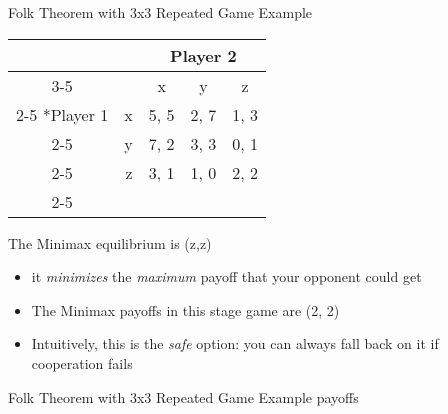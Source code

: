 \begin{frame}{Folk Theorem with 3x3 Repeated Game Example}
  \begin{center}
  \begin{tabular}{cr|c|c|c|}
  	& \multicolumn{1}{c}{} & \multicolumn{3}{c}{Player 2}\\ \cline{3-5}
    \multicolumn{1}{c}{} & \multicolumn{1}{c}{} & x & y & z \\\cline{2-5}
    \multirow{3}*{Player 1}  & x & 5, 5 & 2, 7 & 1, 3 \\\cline{2-5}
                             & y & 7, 2 & 3, 3 & 0, 1 \\\cline{2-5}
                             & z & 3, 1 & 1, 0 & 2, 2 \\\cline{2-5}
  \end{tabular}
  \end{center}

  The \alert{Minimax} equilibrium is (z,z)
  \begin{itemize}
    \item it \textit{minimizes} the \textit{maximum} payoff that your opponent could get
    \item The Minimax payoffs in this stage game are (2, 2)
    \item Intuitively, this is the \textit{safe} option: you can always fall back on it if cooperation fails
  \end{itemize}
\end{frame}

\begin{frame}{Folk Theorem with 3x3 Repeated Game Example payoffs}
\end{frame}

